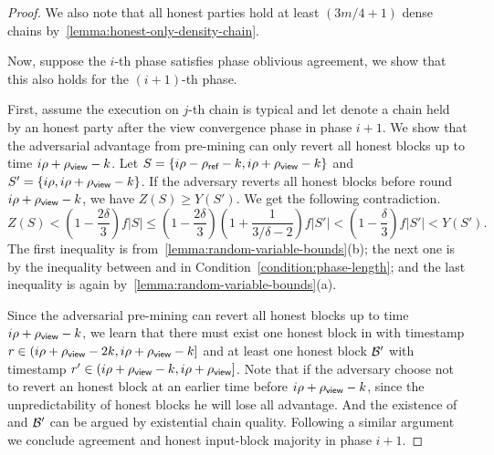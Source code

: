 \begin{proof}
    We also note that  all honest parties hold at least $(3m / 4 + 1)$ dense chains by~\cref{lemma:honest-only-density-chain}.

    Now, suppose the $i$-th phase satisfies phase oblivious agreement, we show that this also holds for the $(i + 1)$-th phase.

    First, assume the execution on $j$-th chain is typical and let \chain denote a chain held by an honest party after the view convergence phase in phase $i + 1$.
    We show that the adversarial advantage from pre-mining can only revert all honest blocks up to time $i \rho  + \rho_{\textsf{view}} - k$.
    Let $S = \{i \rho - \rho_{\textsf{ref}} - k, i \rho + \rho_{\textsf{view}} - k\}$ and  $S' = \{i \rho, i \rho + \rho_{\textsf{view}} - k\}$.
    If the adversary reverts all honest blocks before round $ i \rho + \rho_{\textsf{view}} - k$, we have $Z(S) \ge Y(S')$.
    We get the following contradiction.
    \[ Z(S) < (1 - \frac{2\delta}{3}) f |S| \le (1 - \frac{2\delta}{3})(1 + \frac{1}{3 / \delta -2}) f |S'| < (1 - \frac{\delta}{3}) f |S'| < Y(S'). \]
    The first inequality is from~\cref{lemma:random-variable-bounds}(b); the next one is by the inequality between \phaseViewLength and \phaseRefLength in Condition~\eqref{condition:phase-length}; and the last inequality is again by~\cref{lemma:random-variable-bounds}(a).

    Since the adversarial pre-mining can revert all honest blocks up to time $i \rho + \rho_{\textsf{view}} - k$, we learn that there must exist one honest block \block in \chain with timestamp $r \in (i \rho  + \rho_{\textsf{view}} - 2k, i \rho + \rho_{\textsf{view}} - k]$ and at least one honest block $\mathcal{B}'$ with timestamp $r' \in (i \rho + \rho_{\textsf{view}} -k, i \rho + \rho_{\textsf{view}}]$.
    Note that if the adversary choose not to revert an honest block at an earlier time before $i \rho + \rho_{\textsf{view}} - k$, since the unpredictability of honest blocks he will lose all advantage.
    And the existence of \block and $\mathcal{B}'$ can be argued by existential chain quality.
    Following a similar argument we conclude agreement and honest input-block majority in phase $i + 1$.
\end{proof}
